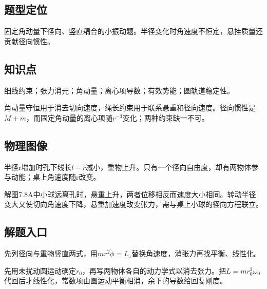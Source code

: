 \documentclass[UTF8,fontset=fandol,a4paper,11pt]{ctexart}
\begin{document}

\subsection*{题型定位}

固定角动量下径向、竖直耦合的小振动题。半径变化时角速度不恒定，悬挂质量还贡献径向惯性。



\subsection*{知识点}

细线约束；张力消元；角动量；离心项导数；有效势能；圆轨道稳定性。

角动量守恒用于消去切向速度，绳长约束用于联系悬重和径向速度。径向惯性是$M+m$，而固定角动量的离心项随$r^{-3}$变化；两种约束缺一不可。




\subsection*{物理图像}

半径r增加时孔下线长\(l-r\)减小，重物上升。只有一个径向自由度，却有两物体参与动能；桌上角速度随r改变。

解图7.8A中小球远离孔时，悬重上升，两者位移相反而速度大小相同。转动半径变大又使切向角速度下降，悬重加速度改变张力，需与桌上小球的径向方程联立。




\subsection*{解题入口}

先列径向与重物竖直两式，用\(mr^2\dot\phi=L_z\)替换角速度，消张力再找平衡、线性化。

先用未扰动圆运动确定$r_0$，再写两物体各自的动力学式以消去张力。把$L=mr_0^2\omega_0$代回后才线性化，常数项由圆运动平衡相消，余下的导数给回复刚度。




\end{document}
